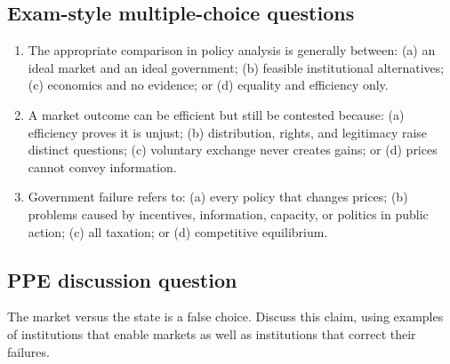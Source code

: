 \subsection*{Exam-style multiple-choice questions}
\begin{enumerate}[resume,label=\arabic*.]
  \item The appropriate comparison in policy analysis is generally between: (a) an ideal market and an ideal government; (b) feasible institutional alternatives; (c) economics and no evidence; or (d) equality and efficiency only.
  \item A market outcome can be efficient but still be contested because: (a) efficiency proves it is unjust; (b) distribution, rights, and legitimacy raise distinct questions; (c) voluntary exchange never creates gains; or (d) prices cannot convey information.
  \item Government failure refers to: (a) every policy that changes prices; (b) problems caused by incentives, information, capacity, or politics in public action; (c) all taxation; or (d) competitive equilibrium.
\end{enumerate}

\subsection*{PPE discussion question}

\noindent The market versus the state is a false choice. Discuss this claim,
using examples of institutions that enable markets as well as institutions that
correct their failures.
